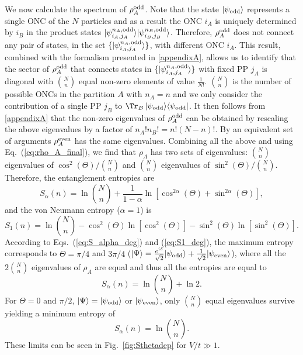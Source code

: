We now calculate the spectrum of $\rho_A^{\rm odd}$. Note that the state $\vert
\psi_{\rm odd}\rangle$ represents a single ONC of the $N$ particles and as a
result the ONC $i_A$ is uniquely determined by $i_B$ in the product states
$\vert \psi^{n_A,\rm{odd}}_{i_A,j_A}\rangle\vert
\psi^{n_B,\rm{odd}}_{i_B,j_B}\rangle$. Therefore, $\rho_A^{\rm odd}$ does not
connect any pair of states, in the set $\{\vert
\psi^{n_A,\rm{odd}}_{i_A,j_A}\rangle\}$, with different ONC $i_A$. This result,
combined with the formalism presented in \ref{appendixA}, allows us to identify
that the sector
of $\rho_A^{\rm odd}$ that connects states in $\{\vert
\psi^{n_A,\rm{odd}}_{i_A,j_A}\rangle\}$ with
fixed PP $j_A$ is diagonal with $\binom{N}{n}$ equal non-zero elements of value
$\frac{1}{N!}$.  $\binom{N}{n}$ is the number of possible ONCs in the
partition $A$ with $n_A=n$ and we only consider the contribution of a single PP
$j_B$ to ${\Tr}_{B}\,\vert\psi_{\rm{odd}}\rangle\langle\psi_{\rm{odd}}\vert$.
It then follows from \ref{appendixA} that the non-zero eigenvalues of
$\rho_A^{\rm odd}$  can be obtained by rescaling the above eigenvalues by a factor
of $n_A!n_B!=n!(N-n)!$.  By an equivalent set of arguments 
$\rho_A^{\rm even}$ has the same eigenvalues. Combining all the above and using
Eq.~(\ref{eq:rho_A_final}), we find that $\rho_A$ has two sets of eigenvalues:
$\binom{N}{n}$ eigenvalues of $\cos^2(\Theta)/{\binom{N}{n}}$ and
$\binom{N}{n}$ eigenvalues of $\sin^2(\Theta)/{\binom{N}{n}}$. Therefore, 
the \ren entanglement entropies are
%
\begin{equation}
S_{\alpha}(n) = \ln
\binom{N}{n}+
\frac{1}{1-\alpha} \ln\left[\cos^{2\alpha}(\Theta)+\sin^{2\alpha}(\Theta)\right]
\label{eq:S_alpha_deg},
\end{equation}
%
and the von Neumann entropy ($\alpha = 1$) is
%
\begin{equation}
S_1(n) = \ln \binom{N}{n}-\cos^2(\Theta)
\ln\left[\cos^2(\Theta)\right]-\sin^2(\Theta)\ln\left[\sin^2(\Theta)\right].
\label{eq:S1_deg}
\end{equation}
%
According to Eqs.~(\ref{eq:S_alpha_deg}) and (\ref{eq:S1_deg}), the maximum
entropy corresponds to $\Theta=\pi/4$ and $3\pi/4$ ($\vert\Psi\rangle=
\frac{e^{i\delta}}{\sqrt{2}}\vert\psi_{\rm{odd}}\rangle+\frac{1}{\sqrt{2}}\vert\psi_{\rm{even}}\rangle$),
where all the $2\binom{N}{n}$ eigenvalues of $\rho_A$ are equal and thus all
the \ren entropies are equal to
%
\begin{equation}
S_{\alpha}(n) = \ln \binom{N}{n}+\ln2.
\label{eq:rho_A_final1}
\end{equation}
%
For $\Theta=0$ and $\pi/2$,  $\vert\Psi\rangle= \vert\psi_{\rm{odd}}\rangle$ or
$\vert\psi_{\rm{even}}\rangle$, only $\binom{N}{n}$ equal eigenvalues survive
yielding a minimum entropy of
%
\begin{equation}
S_{\alpha}(n) = \ln \binom{N}{n}.
\label{eq:rho_A_final2}
\end{equation}
These limits can be seen in Fig.~\ref{fig:Sthetadep} for $V/t \gg 1$.